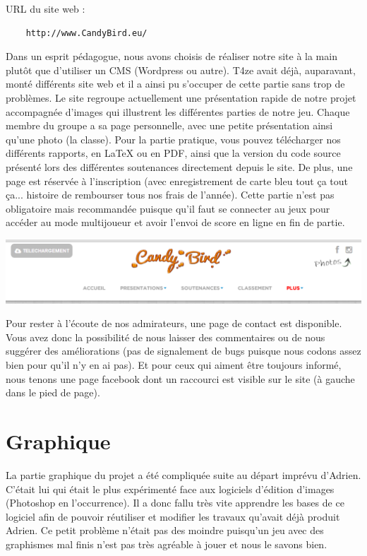 \documentclass [11pt]{report}
\begin{document}
	URL du site web : 
	\begin{Verbatim}
	http://www.CandyBird.eu/
	\end{Verbatim}
	
	Dans un esprit pédagogue, nous avons choisis de réaliser notre site à la main plutôt que d'utiliser un CMS (Wordpress ou autre). T4ze avait déjà, auparavant, monté différents site web et il a ainsi pu s'occuper de cette partie sans trop de problèmes. Le site regroupe actuellement une présentation rapide de notre projet accompagnée d'images qui illustrent les différentes parties de notre jeu. Chaque membre du groupe a sa page personnelle, avec une petite présentation ainsi qu'une photo (la classe). Pour la partie pratique, vous pouvez télécharger nos différents rapports, en LaTeX ou en PDF, ainsi que la version du code source présenté lors des différentes soutenances directement depuis le site. De plus, une page est réservée à l'inscription (avec enregistrement de carte bleu tout ça tout ça... histoire de rembourser tous nos frais de l'année). Cette partie n'est pas obligatoire mais recommandée puisque qu'il faut se connecter au jeux pour accéder au mode multijoueur et avoir l'envoi de score en ligne en fin de partie.\\
	\vspace{4mm}
	
	\begin{center}
	\includegraphics[scale=0.5]{images/site.png}
	\end{center}
	
	\vspace{10mm}
	
	Pour rester à l'écoute de nos admirateurs, une page de contact est disponible. Vous avez donc la possibilité de nous laisser des commentaires ou de nous suggérer des améliorations (pas de signalement de bugs puisque nous codons assez bien pour qu'il n'y en ai pas). Et pour ceux qui aiment être toujours informé, nous tenons une page facebook dont un raccourci est visible sur le site (à gauche dans le pied de page).
	
	\vspace{10mm}
	
	\newpage
	
	\section{Graphique}
	La partie graphique du projet a été compliquée suite au départ imprévu d'Adrien. C'était lui qui était le plus expérimenté face aux logiciels d'édition d'images (Photoshop en l'occurrence). Il a donc fallu  très vite apprendre les bases de ce logiciel afin de pouvoir réutiliser et modifier les travaux qu'avait déjà produit Adrien. Ce petit problème n'était pas des moindre puisqu'un jeu avec des graphismes mal finis n'est pas très agréable à jouer et nous le savons bien.
	
\end{document}
